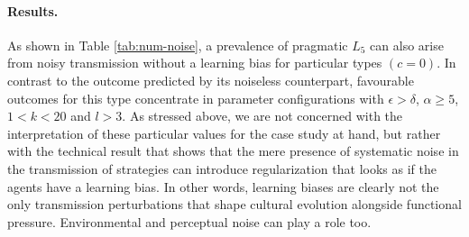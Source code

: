 \documentclass[a4paper]{article}
\begin{document}
\paragraph{Results.} As shown in Table \ref{tab:num-noise}, a prevalence of pragmatic $L_5$ can also arise from noisy transmission without a learning bias for particular types $(c = 0)$. In contrast to the outcome predicted by its noiseless counterpart, favourable outcomes for this type concentrate in parameter configurations  with $\epsilon > \delta$, $\alpha \geq 5$, $1 < k < 20$ and $l > 3$. As stressed above, we are not concerned with the interpretation of these particular values for the case study at hand, but rather with the technical result that shows that the mere presence of systematic noise in the transmission of strategies can introduce regularization that looks as if the agents have a learning bias. In other words, learning biases are clearly not the only transmission perturbations that shape cultural evolution alongside functional pressure. Environmental and perceptual noise can play a role too.
\end{document}
